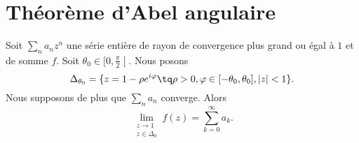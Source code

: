\section{Théorème d'Abel angulaire}

\begin{theorem}   \label{ThoTGjmeen}
	Soit \( \sum_{n}a_nz^n\) une série entière de rayon de convergence plus grand ou égal à \( 1\) et de somme \( f\). Soit \( \theta_0\in\mathopen[ 0 , \frac{ \pi }{2} \mathclose[\). Nous posons
	\begin{equation}
		\Delta_{\theta_0}=\{ z=1-\rho e^{i\varphi}\tq \rho>0,\varphi\in\mathopen[ -\theta_0 , \theta_0 \mathclose],| z |<1 \}.
	\end{equation}
	Nous supposons de plus que \( \sum_na_n\) converge. Alors
	\begin{equation}
		\lim_{\substack{z\to1\\z\in\Delta_0}}f(z)=\sum_{k=0}^{\infty}a_k.
	\end{equation}
\end{theorem}

